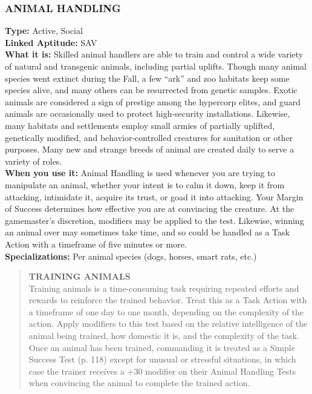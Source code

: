\subsubsection{ANIMAL HANDLING}
\textbf{Type:} Active, Social
\\ \textbf{Linked Aptitude:} SAV
\\ \textbf{What it is:} Skilled animal handlers are able to
train and control a wide variety of natural and transgenic animals, including partial uplifts. Though many
animal species went extinct during the Fall, a few
“ark” and zoo habitats keep some species alive, and
many others can be resurrected from genetic samples.
Exotic animals are considered a sign of prestige
among the hypercorp elites, and guard animals are
occasionally used to protect high-security installations.
Likewise, many habitats and settlements employ small
armies of partially uplifted, genetically modified, and
behavior-controlled creatures for sanitation or other
purposes. Many new and strange breeds of animal are
created daily to serve a variety of roles.
\\ \textbf{When you use it:} Animal Handling is used whenever
you are trying to manipulate an animal, whether your
intent is to calm it down, keep it from attacking, intimidate it, acquire its trust, or goad it into attacking.
Your Margin of Success determines how effective you
are at convincing the creature. At the gamemaster’s
discretion, modifiers may be applied to the test. Likewise, winning an animal over may sometimes take
time, and so could be handled as a Task Action with a
timeframe of five minutes or more.
\\ \textbf{Specializations:} Per animal species (dogs, horses, smart
rats, etc.)

\begin{quotation}
\textbf{TRAINING ANIMALS}
\\
Training animals is a time-consuming task requiring
repeated efforts and rewards to reinforce the trained
behavior. Treat this as a Task Action with a timeframe
of one day to one month, depending on the complexity of the action. Apply modifiers to this test based on
the relative intelligence of the animal being trained,
how domestic it is, and the complexity of the task.
Once an animal has been trained, commanding
it is treated as a Simple Success Test (p. 118) except
for unusual or stressful situations, in which case the
trainer receives a +30 modifier on their Animal Handling Tests when convincing the animal to complete
the trained action.
\end{quotation}

